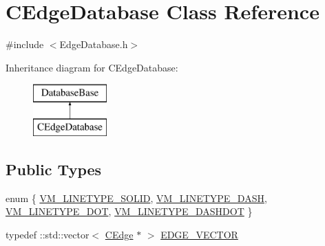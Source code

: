 \hypertarget{class_c_edge_database}{}\section{C\+Edge\+Database Class Reference}
\label{class_c_edge_database}


{\ttfamily \#include $<$Edge\+Database.\+h$>$}

Inheritance diagram for C\+Edge\+Database\+:\begin{figure}[H]
\begin{center}
\leavevmode
\includegraphics[height=2.000000cm]{class_c_edge_database}
\end{center}
\end{figure}
\subsection*{Public Types}
\begin{DoxyCompactItemize}
\item 
enum \{ \hyperlink{class_c_edge_database_a0e2a4f3c8ec9f1bd854a942eaf5eb39aa8140b7cc8f2a1eb98d4be088df6ca73c}{V\+M\+\_\+\+L\+I\+N\+E\+T\+Y\+P\+E\+\_\+\+S\+O\+L\+I\+D}, 
\hyperlink{class_c_edge_database_a0e2a4f3c8ec9f1bd854a942eaf5eb39aabaacd270f9556f86810f1ff1d79f2513}{V\+M\+\_\+\+L\+I\+N\+E\+T\+Y\+P\+E\+\_\+\+D\+A\+S\+H}, 
\hyperlink{class_c_edge_database_a0e2a4f3c8ec9f1bd854a942eaf5eb39aa2c1491dfca16cdf8f1f5152e4ea9b4a6}{V\+M\+\_\+\+L\+I\+N\+E\+T\+Y\+P\+E\+\_\+\+D\+O\+T}, 
\hyperlink{class_c_edge_database_a0e2a4f3c8ec9f1bd854a942eaf5eb39aa8c1174306f94a5133b7cbc5f1cb3094d}{V\+M\+\_\+\+L\+I\+N\+E\+T\+Y\+P\+E\+\_\+\+D\+A\+S\+H\+D\+O\+T}
 \}
\item 
typedef \+::std\+::vector$<$ \hyperlink{class_c_edge}{C\+Edge} $\ast$ $>$ \hyperlink{class_c_edge_database_a08466635640bd52b2f5a31418c7fc9e6}{E\+D\+G\+E\+\_\+\+V\+E\+C\+T\+O\+R}
\end{DoxyCompactItemize}
